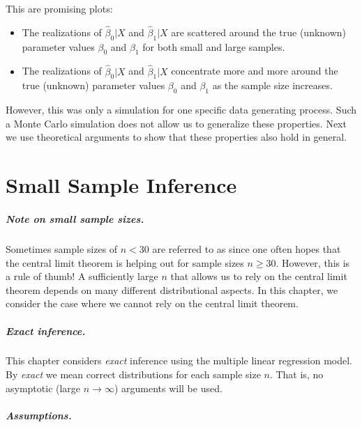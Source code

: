 \documentclass[
  14pt,
]{memoir}
\begin{document}
This are promising plots:

\begin{itemize}
\item The realizations of $\hat\beta_0|X$ and $\hat\beta_1|X$ are scattered around the true (unknown) parameter values $\beta_0$ and $\beta_1$ for both small and large samples.
\item The realizations of $\hat\beta_0|X$ and $\hat\beta_1|X$ concentrate more and more around the true (unknown) parameter values $\beta_0$ and $\beta_1$ as the sample size increases. 
\end{itemize}

However, this was only a simulation for one specific data generating process. Such a Monte Carlo simulation does not allow us to generalize these properties. Next we use theoretical arguments to show that these properties also hold in general.

\hypertarget{ch:SSINF}{%
\chapter{Small Sample Inference}\label{ch:SSINF}}

\paragraph*{Note on small sample sizes.}

Sometimes sample sizes of \(n<30\) are referred to as  since one often hopes that the central limit theorem is helping out for sample sizes \(n \geq 30\). However, this is a  rule of thumb! A sufficiently large \(n\) that allows us to rely on the central limit theorem depends on many different distributional aspects. In this chapter, we consider the case where we cannot rely on the central limit theorem.

\paragraph*{Exact inference.}

This chapter considers \emph{exact} inference using the multiple linear regression model. By \emph{exact} we mean correct distributions for each sample size \(n\). That is, no asymptotic (large \(n\to\infty\)) arguments will be used.

\paragraph*{Assumptions.}
\end{document}
